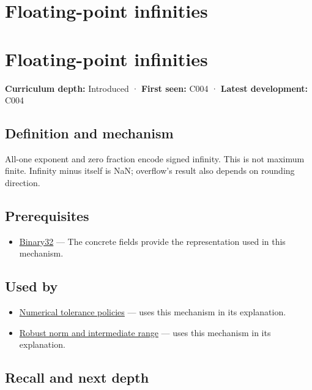 \hypertarget{appendix-eb336149c00a}{}
\section*{Floating-point infinities}
\section{Floating-point infinities}\label{appendix-eb336149c00a-floating-point-infinities}

\textbf{Curriculum depth:} Introduced · \textbf{First seen:} C004 · \textbf{Latest development:} C004

\subsection{Definition and mechanism}\label{appendix-eb336149c00a-definition-and-mechanism}

All-one exponent and zero fraction encode signed infinity. This is not maximum finite. Infinity minus itself is NaN; overflow's result also depends on rounding direction.

\subsection{Prerequisites}\label{appendix-eb336149c00a-prerequisites}

\begin{itemize}
\tightlist
\item
  \hyperref[appendix-5057f9ad327f]{Binary32} --- The concrete fields provide the representation used in this mechanism.
\end{itemize}

\subsection{Used by}\label{appendix-eb336149c00a-used-by}

\begin{itemize}
\tightlist
\item
  \hyperref[appendix-0ec599f8ba27]{Numerical tolerance policies} --- uses this mechanism in its explanation.
\item
  \hyperref[appendix-7f1e17dcafb1]{Robust norm and intermediate range} --- uses this mechanism in its explanation.
\end{itemize}

\subsection{Recall and next depth}\label{appendix-eb336149c00a-recall-and-next-depth}


